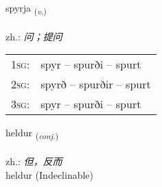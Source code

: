 \documentclass[frontgrid, backgrid]{flacards}\usepackage[]{graphicx}\usepackage[]{xcolor}
\begin{document}
\renewcommand{\flhead}{\vskip5pt \fboxsep=0pt {\small\bfseries\footnotesize Sagnorð | 动词}}
\renewcommand{\fcfoot}{\vskip5pt \fboxsep=0pt \hspace{2pt}{\small\bfseries\footnotesize 1K}}

\renewcommand{\blhead}{\vskip5pt {\small\bfseries\footnotesize Sagnorð | 动词 }}
\renewcommand{\bcfoot}{\vskip5pt \hspace{2pt}{\small\bfseries\footnotesize 1K}}


{spyrja \small{\textsubscript{(\textit{v.})}} \\[1ex] %
\textphonetic{[spɪrja]} \\
zh.: \emph{问；提问} \\  [2ex]
\renewcommand*{\arraystretch}{0.8}
\begin{tabular}{p{1cm}l}
\textsc{1sg}: & spyr -- spurði -- spurt \\ 
\textsc{2sg}: & spyrð -- spurðir -- spurt \\ 
\textsc{3sg}: & spyr -- spurði -- spurt \\ 
\end{tabular}
}


\renewcommand{\flhead}{\vskip5pt \fboxsep=0pt {\small\bfseries\footnotesize Samtenging | 连词}}
\renewcommand{\fcfoot}{\vskip5pt \fboxsep=0pt \hspace{2pt}{\small\bfseries\footnotesize 1K}}

\renewcommand{\blhead}{\vskip5pt {\small\bfseries\footnotesize Samtenging | 连词 }}
\renewcommand{\bcfoot}{\vskip5pt \hspace{2pt}{\small\bfseries\footnotesize 1K}}


{heldur \small{\textsubscript{(\textit{conj.})}} \\[1ex]
\textphonetic{[hɛltʏr]} \\
zh.: \emph{但，反而} \\  [2ex]
heldur (Indeclinable)}

\renewcommand{\flhead}{\vskip5pt \fboxsep=0pt {\small\bfseries\footnotesize Nafnorð | 名词}}
\renewcommand{\fcfoot}{\vskip5pt \fboxsep=0pt \hspace{2pt}{\small\bfseries\footnotesize 1K}}
\end{document}
